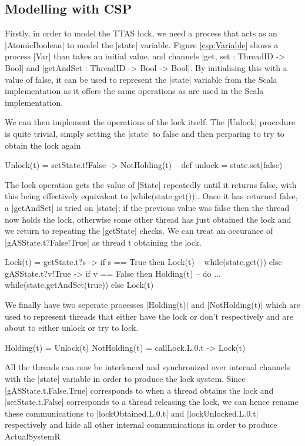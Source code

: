 \subsection{Modelling with CSP}

Firstly, in order to model the TTAS lock, we need a process that acts as an |AtomicBoolean| to model the |state| variable. Figure \ref{csp:Variable} shows a process |Var| than takes an initial value, and channels |get, set : ThreadID -> Bool| and |getAndSet : ThreadID -> Bool -> Bool|. By initialising this with a value of false, it can be used to represent the |state| variable from the Scala implementation as it offers the same operations as are used in the Scala implementation.

We can then implement the operations of the lock itself. The |Unlock| procedure is quite trivial, simply setting the |state| to false and then perparing to try to obtain the lock again
\begin{cspm}
  Unlock(t) = setState.t!False -> NotHolding(t) -- def unlock = state.set(false)
\end{cspm}

The lock operation gets the value of |State| repeatedly until it returns false, with this being effectively equivalent to |while(state.get()){}|. Once it has returned false, a |getAndSet| is tried on |state|; if the previous value was false then the thread now holds the lock, otherwise some other thread has just obtained the lock and we return to repeating the |getState| checks. We can treat an occurance of |gASState.t?False!True| as thread t obtaining the lock.

\begin{cspm}
  Lock(t) =  getState.t?s -> if s == True then Lock(t) -- while(state.get()){ }
           else gASState.t?v!True -> if v == False then Holding(t) 
                -- do ... while(state.getAndSet(true))
           else Lock(t)
\end{cspm}

We finally have two seperate processes |Holding(t)| and |NotHolding(t)| which are used to represent threads that either have the lock or don't respectively and are about to either unlock or try to lock.

\begin{cspm}
  Holding(t) = Unlock(t)
  NotHolding(t) = callLock.L.0.t -> Lock(t)
\end{cspm}

All the threads can now be interleaced and synchronized over internal channels with the |state| variable in order to produce the lock system. Since |gASState.t.False.True| corresponds to when a thread obtains the lock and |setState.t.False| corresponds to a thread releasing the lock, we can hence rename these communications to |lockObtained.L.0.t| and |lockUnlocked.L.0.t| respectively and hide all other internal communications in order to produce ActualSystemR

